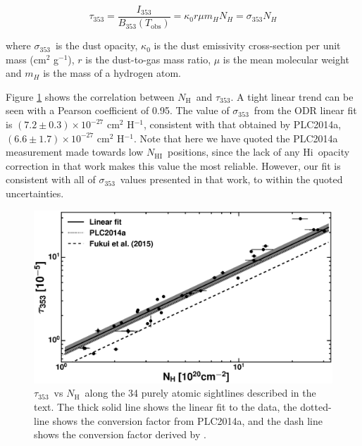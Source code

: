 \documentclass[preprint]{emulateapj}
\def\hi{H{\sc i}}
\def\NHI{$N_\mathrm{HI}$}
\def\NH{$N_\mathrm{H}$}
\def\s{s$^{-1}$}
\def\s353{$\sigma_{353}$}
\def\t353{$\tau_{353}$}
\begin{document}
\begin{equation}
\tau_{353} = \frac{I_{353}}{B_{353}(T_\mathrm{obs})} = \kappa_{0}r\mu m_{H}N_{H} = \sigma_{353}N_{H}
\label{eq_t353_nh}
\end{equation}

\noindent where \s353\ is the dust opacity, $\kappa_{0}$ is the dust emissivity cross-section per unit mass (cm$^{2}$ g$^{-1}$), $r$ is the dust-to-gas mass ratio, $\mu$ is the mean molecular weight and $m_{H}$ is the mass of a hydrogen atom.

Figure \ref{fig:tau_vs_nhi} shows the correlation between  \NH\ and \t353. A tight linear trend can be seen with a Pearson coefficient of 0.95. The value of \s353\ from the ODR linear fit is $(7.2\pm 0.3){\times}10^{-27}$ cm$^{2}$ H$^{-1}$, consistent with that obtained by PLC2014a, $(6.6\pm 1.7){\times}10^{-27}$ cm$^{2}$ H$^{-1}$. Note that here we have quoted the PLC2014a measurement made towards low \NHI\ positions, since the lack of any \hi\ opacity correction in that work makes this value the most reliable. However, our fit is consistent with all of \s353\ values presented in that work, to within the quoted uncertainties. %

\begin{figure}[h]
\centering
\includegraphics[width=1.0\linewidth]{fig/tau_vs_nh.eps}
\caption{\t353\ vs \NH\ along the 34 purely atomic sightlines described in the text. The thick solid line shows the linear fit to the data, the dotted-line shows the conversion factor from PLC2014a, and the dash line shows the conversion factor derived by \citet{Fukui2015}.}
\label{fig:tau_vs_nhi}
\end{figure}
\end{document}
